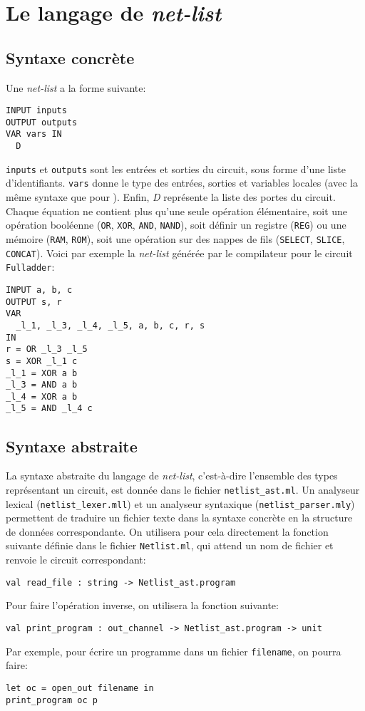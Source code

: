 \documentclass[a4paper]{article}
\begin{document}
\section{Le langage de \emph{net-list}}

\subsection{Syntaxe concrète}

Une \emph{net-list} a la forme suivante:
\begin{lstlisting}[language=nl]
INPUT inputs
OUTPUT outputs
VAR vars IN
  D
\end{lstlisting}
\texttt{inputs} et \texttt{outputs} sont les entrées et sorties du circuit, sous forme d'une liste d'identifiants. \texttt{vars} donne le type des entrées, sorties et variables locales (avec la même syntaxe que pour \minijazz{}). Enfin, \emph{D} représente la liste des portes du circuit. Chaque équation ne contient plus qu'une seule opération élémentaire, soit une opération booléenne (\texttt{OR}, \texttt{XOR}, \texttt{AND}, \texttt{NAND}), soit définir un registre (\texttt{REG}) ou une mémoire (\texttt{RAM}, \texttt{ROM}), soit une opération sur des nappes de fils (\texttt{SELECT}, \texttt{SLICE}, \texttt{CONCAT}). Voici par exemple la \emph{net-list} générée par le compilateur pour le circuit \texttt{Fulladder}:
\begin{lstlisting}
INPUT a, b, c
OUTPUT s, r
VAR
  _l_1, _l_3, _l_4, _l_5, a, b, c, r, s
IN
r = OR _l_3 _l_5
s = XOR _l_1 c
_l_1 = XOR a b
_l_3 = AND a b
_l_4 = XOR a b
_l_5 = AND _l_4 c
\end{lstlisting}

\subsection{Syntaxe abstraite}

La syntaxe abstraite du langage de \emph{net-list}, c'est-à-dire l'ensemble des types représentant un circuit, est donnée dans le fichier \texttt{netlist\_ast.ml}. Un analyseur lexical (\texttt{netlist\_lexer.mll}) et un analyseur syntaxique (\texttt{netlist\_parser.mly}) permettent de traduire un fichier texte dans la syntaxe concrète en la structure de données correspondante. On utilisera pour cela directement la fonction suivante définie dans le fichier \texttt{Netlist.ml}, qui attend un nom de fichier et renvoie le circuit correspondant:
\begin{lstlisting}[language={[objective]caml}]
val read_file : string -> Netlist_ast.program
\end{lstlisting}

Pour faire l'opération inverse, on utilisera la fonction suivante:
\begin{lstlisting}[language={[objective]caml}, xrightmargin=0.5cm]
val print_program : out_channel -> Netlist_ast.program -> unit
\end{lstlisting}
Par exemple, pour écrire un programme dans un fichier \texttt{filename}, on pourra faire:
\begin{lstlisting}[language={[objective]caml}]
let oc = open_out filename in
print_program oc p
\end{lstlisting}
\end{document}
